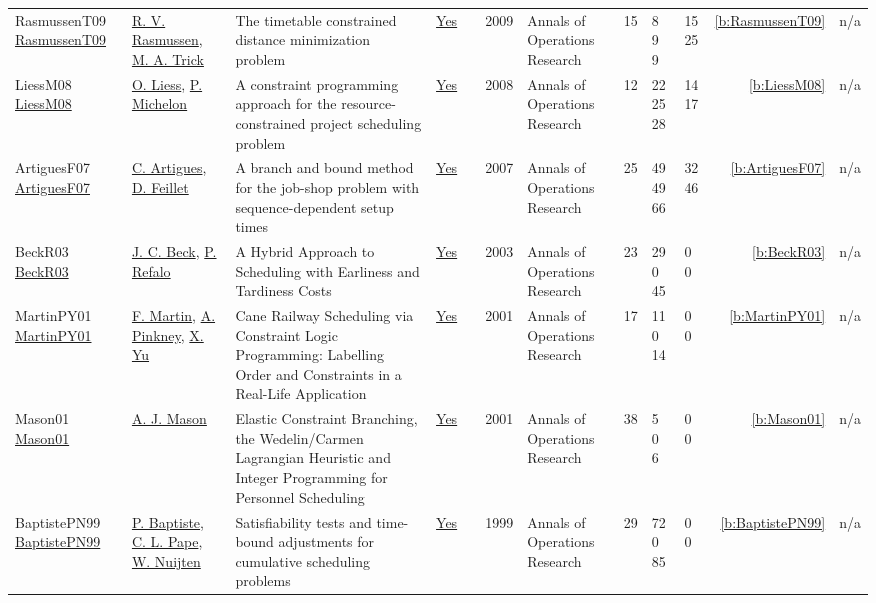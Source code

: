 {\begin{longtable}{>{\raggedright\arraybackslash}p{3cm}>{\raggedright\arraybackslash}p{4.5cm}>{\raggedright\arraybackslash}p{6.0cm}rrrp{2.5cm}rp{1cm}p{1cm}rr}
RasmussenT09 \href{http://dx.doi.org/10.1007/s10479-008-0384-4}{RasmussenT09} & \hyperref[auth:a1404]{R. V. Rasmussen}, \hyperref[auth:a1390]{M. A. Trick} & \cellcolor{green!10}The timetable constrained distance minimization problem & \href{../works/RasmussenT09.pdf}{Yes} & \cite{RasmussenT09} & 2009 & Annals of Operations Research & 15 & 8 9 9 & 15 25 & \ref{b:RasmussenT09} & n/a\\
LiessM08 \href{https://doi.org/10.1007/s10479-007-0188-y}{LiessM08} & \hyperref[auth:a639]{O. Liess}, \hyperref[auth:a355]{P. Michelon} & A constraint programming approach for the resource-constrained project scheduling problem & \href{../works/LiessM08.pdf}{Yes} & \cite{LiessM08} & 2008 & Annals of Operations Research & 12 & 22 25 28 & 14 17 & \ref{b:LiessM08} & n/a\\
ArtiguesF07 \href{http://dx.doi.org/10.1007/s10479-007-0283-0}{ArtiguesF07} & \hyperref[auth:a6]{C. Artigues}, \hyperref[auth:a356]{D. Feillet} & \cellcolor{green!10}A branch and bound method for the job-shop problem with sequence-dependent setup times & \href{../works/ArtiguesF07.pdf}{Yes} & \cite{ArtiguesF07} & 2007 & Annals of Operations Research & 25 & 49 49 66 & 32 46 & \ref{b:ArtiguesF07} & n/a\\
BeckR03 \href{https://doi.org/10.1023/A:1021849405707}{BeckR03} & \hyperref[auth:a89]{J. C. Beck}, \hyperref[auth:a254]{P. Refalo} & A Hybrid Approach to Scheduling with Earliness and Tardiness Costs & \href{../works/BeckR03.pdf}{Yes} & \cite{BeckR03} & 2003 & Annals of Operations Research & 23 & 29 0 45 & 0 0 & \ref{b:BeckR03} & n/a\\
MartinPY01 \href{https://doi.org/10.1023/A:1016067230126}{MartinPY01} & \hyperref[auth:a676]{F. Martin}, \hyperref[auth:a677]{A. Pinkney}, \hyperref[auth:a678]{X. Yu} & Cane Railway Scheduling via Constraint Logic Programming: Labelling Order and Constraints in a Real-Life Application & \href{../works/MartinPY01.pdf}{Yes} & \cite{MartinPY01} & 2001 & Annals of Operations Research & 17 & 11 0 14 & 0 0 & \ref{b:MartinPY01} & n/a\\
Mason01 \href{https://doi.org/10.1023/A:1016023415105}{Mason01} & \hyperref[auth:a679]{A. J. Mason} & Elastic Constraint Branching, the Wedelin/Carmen Lagrangian Heuristic and Integer Programming for Personnel Scheduling & \href{../works/Mason01.pdf}{Yes} & \cite{Mason01} & 2001 & Annals of Operations Research & 38 & 5 0 6 & 0 0 & \ref{b:Mason01} & n/a\\
BaptistePN99 \href{http://dx.doi.org/10.1023/a:1018995000688}{BaptistePN99} & \hyperref[auth:a162]{P. Baptiste}, \hyperref[auth:a163]{C. L. Pape}, \hyperref[auth:a656]{W. Nuijten} & Satisfiability tests and time-bound adjustments for cumulative scheduling problems & \href{../works/BaptistePN99.pdf}{Yes} & \cite{BaptistePN99} & 1999 & Annals of Operations Research & 29 & 72 0 85 & 0 0 & \ref{b:BaptistePN99} & n/a\\

\end{longtable}}

